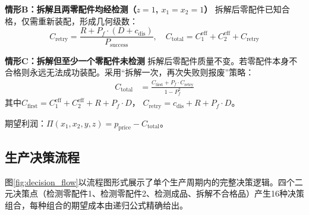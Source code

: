\documentclass[12pt,a4paper]{ctexart}
\begin{document}
\textbf{情形B：拆解且两零配件均经检测（$z=1$, $x_1=x_2=1$）}
拆解后零配件已知合格，仅需重新装配，形成几何级数：
\begin{equation}
    C_{\text{retry}} = \frac{R + P_f \cdot (D + c_{\text{dis}})}{P_{\text{success}}}, \quad
    C_{\text{total}} = C_1^{\text{eff}} + C_2^{\text{eff}} + C_{\text{retry}}
\end{equation}

\textbf{情形C：拆解但至少一个零配件未检测}
拆解后零配件质量不变。若零配件本身不合格则永远无法成功装配。采用``拆解一次，再次失败则报废''策略：
\begin{align}
    C_{\text{total}} &= \frac{C_{\text{first}} + P_f \cdot C_{\text{retry}}}{1 - P_f^2}
\end{align}
其中$C_{\text{first}} = C_1^{\text{eff}} + C_2^{\text{eff}} + R + P_f \cdot D$，
$C_{\text{retry}} = c_{\text{dis}} + R + P_f \cdot D$。

期望利润：$\Pi(x_1,x_2,y,z) = p_{\text{price}} - C_{\text{total}}$。

\subsection{生产决策流程}

图\ref{fig:decision_flow}以流程图形式展示了单个生产周期内的完整决策逻辑。四个二元决策点（检测零配件1、检测零配件2、检测成品、拆解不合格品）产生16种决策组合，每种组合的期望成本由递归公式精确给出。
\end{document}
